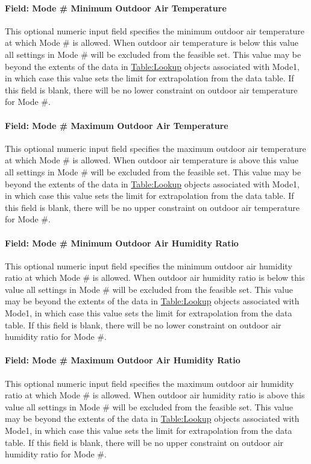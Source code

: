 \paragraph{Field: Mode \# Minimum Outdoor Air Temperature}
This optional numeric input field specifies the minimum outdoor air temperature at which Mode \# is allowed. When outdoor air temperature is below this value all settings in Mode \# will be excluded from the feasible set. This value may be beyond the extents of the  data in \hyperref[tablelookup]{Table:Lookup} objects associated with Mode1, in which case this value sets the limit for extrapolation from the data table. If this field is blank, there will be no lower constraint on outdoor air temperature for Mode \#.

\paragraph{Field: Mode \# Maximum Outdoor Air Temperature}
This optional numeric input field specifies the maximum outdoor air temperature at which Mode \# is allowed. When outdoor air temperature is above this value all settings in Mode \# will be excluded from the feasible set. This value may be beyond the extents of the  data in \hyperref[tablelookup]{Table:Lookup} objects associated with Mode1, in which case this value sets the limit for extrapolation from the data table. If this field is blank, there will be no upper constraint on outdoor air temperature for Mode \#.

\paragraph{Field: Mode \# Minimum Outdoor Air Humidity Ratio}
This optional numeric input field specifies the minimum outdoor air humidity ratio at which Mode \# is allowed. When outdoor air humidity ratio is below this value all settings in Mode \# will be excluded from the feasible set. This value may be beyond the extents of the  data in \hyperref[tablelookup]{Table:Lookup} objects associated with Mode1, in which case this value sets the limit for extrapolation from the data table. If this field is blank, there will be no lower constraint on outdoor air humidity ratio for Mode \#.

\paragraph{Field: Mode \# Maximum Outdoor Air Humidity Ratio}
This optional numeric input field specifies the maximum outdoor air humidity ratio at which Mode \# is allowed. When outdoor air humidity ratio is above this value all settings in Mode \# will be excluded from the feasible set. This value may be beyond the extents of the data in \hyperref[tablelookup]{Table:Lookup} objects associated with Mode1, in which case this value sets the limit for extrapolation from the data table. If this field is blank, there will be no upper constraint on outdoor air humidity ratio for Mode \#.

